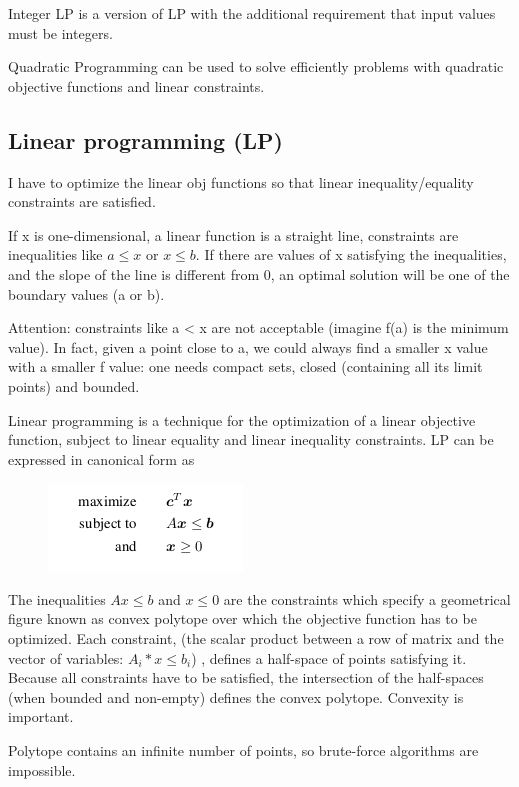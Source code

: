 \documentclass[10pt]{article}
\begin{document}
Integer LP is a version of LP with the additional requirement that input values must be integers. 

Quadratic Programming can be used to solve efficiently problems with quadratic objective functions and linear constraints.

\subsection{Linear programming (LP)}
I have to optimize the linear obj functions so that linear inequality/equality constraints are satisfied. 

If x is one-dimensional, a linear function is a straight line, constraints are inequalities like $ a \leq x $ or $ x \leq b $. If there are values of x satisfying the inequalities, and the slope of the line is different from 0, an optimal solution will be one of the boundary values (a or b). 

Attention: constraints like a < x are not acceptable (imagine f(a) is the minimum value). In fact, given a point close to a, we could always find a smaller x value with a smaller f value: one needs compact sets, closed (containing all its limit points) and bounded.

Linear programming is a technique for the optimization of a linear
objective function, subject to linear equality and linear inequality constraints. LP can be expressed in canonical form
as

\begin{figure}[H]
\includegraphics[scale=0.50]{lp}
\centering
\end{figure}

The inequalities $ Ax \leq b $ and $ x \leq 0 $ are the constraints which specify a geometrical figure known as convex polytope over which the objective function has to be optimized.
Each constraint, (the scalar product between a row of matrix and the vector of variables: $ A_i * x \leq b_i $) , defines a half-space of points satisfying it. Because all constraints have to be satisfied, the intersection of the half-spaces (when bounded and non-empty) defines the convex polytope. Convexity is important.

Polytope contains an infinite number of points, so brute-force algorithms are impossible.
\end{document}
